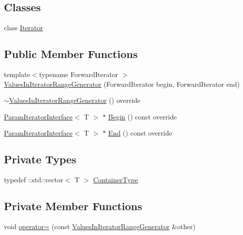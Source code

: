 \subsection*{Classes}
\begin{DoxyCompactItemize}
\item 
class \hyperlink{classtesting_1_1internal_1_1ValuesInIteratorRangeGenerator_1_1Iterator}{Iterator}
\end{DoxyCompactItemize}
\subsection*{Public Member Functions}
\begin{DoxyCompactItemize}
\item 
{\footnotesize template$<$typename Forward\+Iterator $>$ }\\\hyperlink{classtesting_1_1internal_1_1ValuesInIteratorRangeGenerator_a8b30f6028bc5739bbd7c24b0f0e409f7}{Values\+In\+Iterator\+Range\+Generator} (Forward\+Iterator begin, Forward\+Iterator end)
\item 
\hyperlink{classtesting_1_1internal_1_1ValuesInIteratorRangeGenerator_a9070d5b79803164625d3aa77a1659e9f}{$\sim$\+Values\+In\+Iterator\+Range\+Generator} () override
\item 
\hyperlink{classtesting_1_1internal_1_1ParamIteratorInterface}{Param\+Iterator\+Interface}$<$ T $>$ $\ast$ \hyperlink{classtesting_1_1internal_1_1ValuesInIteratorRangeGenerator_a71ffed6f1deba05f11c9d45f6ab5b85d}{Begin} () const override
\item 
\hyperlink{classtesting_1_1internal_1_1ParamIteratorInterface}{Param\+Iterator\+Interface}$<$ T $>$ $\ast$ \hyperlink{classtesting_1_1internal_1_1ValuesInIteratorRangeGenerator_a298cfb66a90b1a39c0cea3ca7ae1ece1}{End} () const override
\end{DoxyCompactItemize}
\subsection*{Private Types}
\begin{DoxyCompactItemize}
\item 
typedef \+::std\+::vector$<$ T $>$ \hyperlink{classtesting_1_1internal_1_1ValuesInIteratorRangeGenerator_afab6b799a125b471a8784ced9cf7335c}{Container\+Type}
\end{DoxyCompactItemize}
\subsection*{Private Member Functions}
\begin{DoxyCompactItemize}
\item 
void \hyperlink{classtesting_1_1internal_1_1ValuesInIteratorRangeGenerator_ab43e1feff118f5be232ae1b85d539dd1}{operator=} (const \hyperlink{classtesting_1_1internal_1_1ValuesInIteratorRangeGenerator}{Values\+In\+Iterator\+Range\+Generator} \&other)
\end{DoxyCompactItemize}
